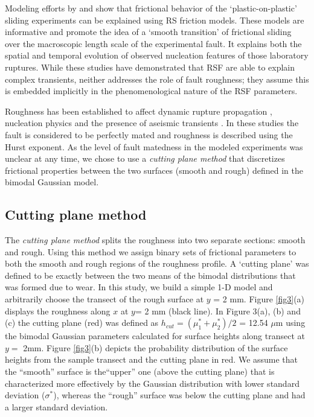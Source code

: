 \documentclass[preprint,1p, 10pt,authoryear]{elsarticle}
\begin{document}
Modeling efforts by \citet{Kaneko2011} and \citet{Kaneko2016} show that frictional behavior of the `plastic-on-plastic' sliding experiments can be explained using RS friction models. These models are informative and promote the idea of a `smooth transition' of frictional sliding over the macroscopic length scale of the experimental fault. It explains both the spatial and temporal evolution of observed nucleation features of those laboratory ruptures. While these studies have demonstrated that RSF are able to explain complex transients, neither addresses the role of fault roughness; they assume this is embedded implicitly in the phenomenological nature of the RSF parameters.

Roughness has been established to affect dynamic rupture propagation \citep[e.g.][]{Dunham2011, Fang2013}, nucleation physics \citep[e.g.][]{Tal2018} and the presence of aseismic transients \citep{Ozawa2019}. In these studies the fault is considered to be perfectly mated and roughness is described using the Hurst exponent. As the level of fault matedness in the modeled experiments was unclear at any time, we chose to use a \textit{cutting plane method} that discretizes frictional properties between the two surfaces (smooth and rough) defined in the bimodal Gaussian model.

\subsection{Cutting plane method}
The \textit{cutting plane method} splits the roughness into two separate sections: smooth and rough. Using this method we assign binary sets of frictional parameters to both the smooth and rough regions of the roughness profile. A `cutting plane' was defined to be exactly between the two means of the bimodal distributions that was formed due to wear. In this study, we build a simple 1-D model and arbitrarily choose the transect of the rough surface at $y$ = 2 mm. Figure \ref{fig3}(a) displays the roughness along $x$ at $y$= 2 mm (black line). In Figure 3(a), (b) and (c) the cutting plane (red) was defined as $h_{cut} = \left(\mu^{*}_{1}+\mu^{*}_{2} \right)/2$ = 12.54 $\mu$m using the bimodal Gaussian parameters calculated for surface heights along transect at $y = $ 2mm. Figure \ref{fig3}(b) depicts the probability distribution of the surface heights from the sample transect and the cutting plane in red. We assume that the ``smooth'' surface is the``upper'' one (above the cutting plane) that is characterized more effectively by the Gaussian distribution with lower standard deviation ($\sigma^{*}$), whereas the ``rough'' surface was below the cutting plane and had a larger standard deviation.
\end{document}
